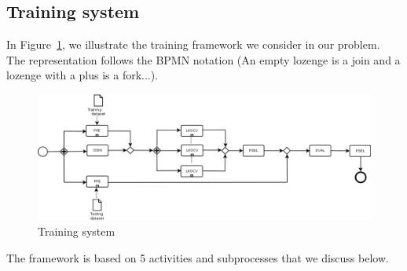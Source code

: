 \documentclass[10pt, conference, compsocconf]{IEEEtran}
\begin{document}
\subsection{Training system}

In Figure~\ref{fig:training}, we illustrate the training framework we consider in our problem. The representation follows the 
BPMN notation (An empty lozenge is a join and a lozenge with a plus is a fork...). 

	\begin{figure}[htbp]
	\centering
	\includegraphics[scale=0.3]{./Figures/workflow.png}
	\caption{Training system}
	\label{fig:training}
	\end{figure}

The framework is based on 5 activities and subprocesses that we discuss below.
\end{document}
